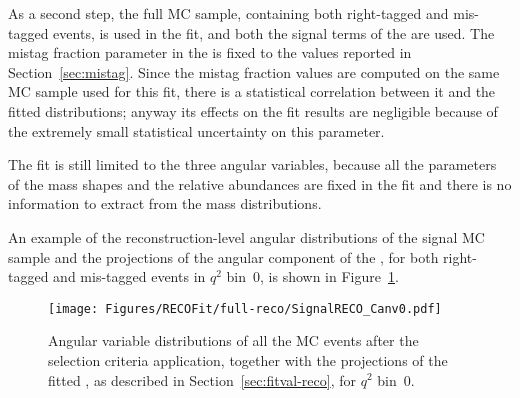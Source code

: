 
As a second step, the full MC sample, containing both right-tagged and mis-tagged events, is used in the fit, and both the signal terms of the \pdf are used.
The mistag fraction parameter in the \pdf is fixed to the values reported in Section~\ref{sec:mistag}.
Since the mistag fraction values are computed on the same MC sample used for this fit, there is a statistical correlation between it and the fitted distributions; anyway its effects on the fit results are negligible because of the extremely small statistical uncertainty on this parameter.

The fit is still limited to the three angular variables, because all the parameters of the mass shapes and the relative abundances are fixed in the fit and there is no information to extract from the mass distributions.

An example of the reconstruction-level angular distributions of the signal MC sample and the projections of the angular component of the \pdf, for both right-tagged and mis-tagged events in $q^2$ bin~0, is shown in Figure~\ref{fig:fullreco-bin0}.

\begin{figure}[!hbt]
  \centering
  \texttt{[image: Figures/RECOFit/full-reco/SignalRECO\_Canv0.pdf]}
  \caption{Angular variable distributions of all the MC events after the selection criteria application, together with the projections of the fitted \pdf, as described in Section~\ref{sec:fitval-reco}, for $q^2$ bin~0.}
  \label{fig:fullreco-bin0}
\end{figure}



